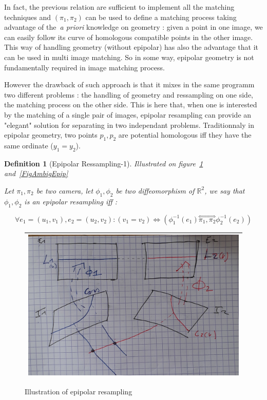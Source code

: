 \documentclass[a4paper]{article}
\newcommand{\RR}{\ensuremath{\mathbb{R}}}
\newcommand{\HComp}{\overset{\Longleftrightarrow}{\scriptscriptstyle \pi_1,\pi_2}}
\newtheorem{definition}{Definition}
\begin{document}
In fact, the previous relation are sufficient to implement all the matching techniques and
$(\pi_1,\pi_2)$ can be used to define a matching process taking advantage
of the~\emph{a priori} knowledge on geometry : given a point in one image, we can easily
follow its curve of  homologous compatible points in the other image.
This way of handling geometry (without epipolar) has also the advantage that it can be used in
multi image matching.  So in some way, epipolar geometry is not fundamentally required in image matching
process.

However the drawback of such approach is that it mixes in the same programm two 
different problems : the handling of geometry and ressampling on one side,
the matching process on the other side. This is here that, when one is interested
by the matching of a single pair of images, epipolar resampling
can provide an "elegant" solution for separating in two independant problems.  Traditionnaly
in epipolar geometry, two points $p_1,p_2$ are potential homologous iff they have the
same ordinate ($y_1=y_2$).

\begin{definition}[Epipolar Ressampling-1] 
\emph{Illustrated on figure~\ref{FigDefEpip} and~\ref{FigAmbigEpip}}

Let $\pi_1,\pi_2$ be two camera, let $\phi_1,\phi_2$  be two diffeomorphism
of $\RR^2$, we say that $\phi_1,\phi_2$  is an epipolar  resampling iff :

\begin{equation}
  \forall e_1=(u_1,v_1) , e_2=(u_2,v_2) : (v_1=v_2)   \Leftrightarrow  (\phi_1^{-1}(e_1) \HComp \phi_2^{-1}(e_2))
\end{equation}
   \label{EqEpiEgalY}
\end{definition}

\begin{figure}
\centering
\begin{tabular}{||c||}
 \hline \hline
\includegraphics[width=15cm]{FIGS/Epip.jpg} 
 \\ \hline \hline
\end{tabular}
\caption{Illustration of epipolar resampling}
\label{FigDefEpip}
\end{figure}
\end{document}

